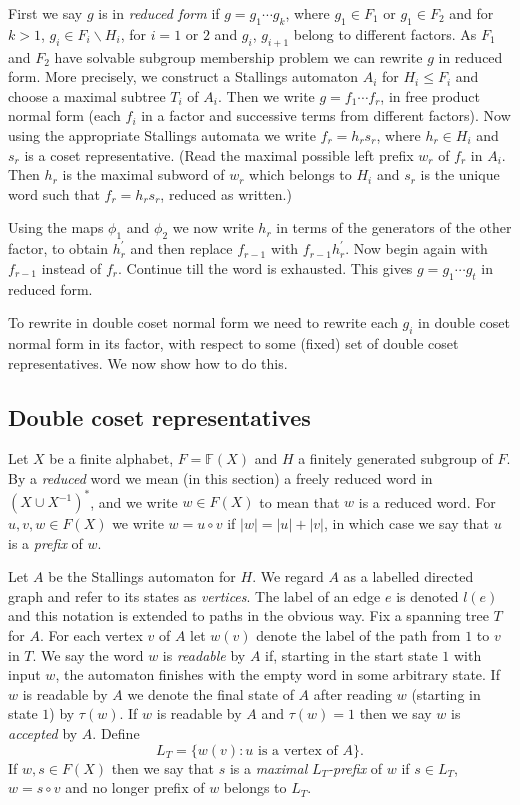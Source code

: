 \documentclass[a4paper,12pt]{article}
\def\t{\tau }
\numberwithin{equation}{section}
\numberwithin{figure}{section}
\newcommand{\FF}{\ensuremath{\mathbb{F}}}
\begin{document}
First we say $g$ is in \emph{reduced form} if $g = g_1 \cdots g_k$, where
$g_1 \in F_1$ or $g_1 \in F_2$ and 
for 
$k > 1$,    $g_i \in F_i \backslash H_i$, for $i=1$ or $2$ 
 and $g_i$, ${g_{i+1}}$ belong to different factors. As $F_1$ and 
$F_2$ have solvable subgroup membership problem we can rewrite $g$ in
reduced form. More precisely, we construct a Stallings automaton $A_i$ for
$H_i\le F_i$ and choose a maximal subtree $T_i$ of $A_i$. 
Then we write $g=f_1\cdots f_r$, in free product normal
form (each $f_i$ in a factor and successive terms from different factors).
Now using the appropriate Stallings automata we write $f_r=h_rs_r$, where
$h_r\in H_i$ and $s_r$ is a coset representative. (Read the maximal 
possible left prefix $w_r$ of $f_r$ in $A_i$. Then $h_r$ is the 
maximal subword of $w_r$ which belongs to $H_i$ and $s_r$ is the
unique word such that $f_r=h_rs_r$, reduced as written.)

Using the maps $\phi_1$ and $\phi_2$ we now write $h_r$ in terms of the
generators of the other factor, to obtain $h^\prime_r$ and then 
replace $f_{r-1}$ with $f_{r-1}h^\prime_r$. Now begin again with
$f_{r-1}$ instead of $f_r$. Continue till the word is exhausted.   
This gives $g=g_1\cdots g_t$ in reduced form.

To rewrite in double coset normal form we need to  
 rewrite
each $g_i$ in double coset normal form in its factor, 
with respect to some (fixed) set
of double coset representatives.  
We now show how to do this.
\subsection{Double coset representatives}
Let $X$ be a finite alphabet, $F=\FF(X)$ and $H$ a finitely generated subgroup
of $F$.  By a {\em reduced} word we mean (in
this section) a freely reduced word in $(X\cup X^{-1})^\ast$, and we write $w\in F(X)$
to mean that $w$ is a reduced word. For $u,v, w\in F(X)$ we 
write $w=u\circ v$ if $|w|=|u|+|v|$, in which case we say that $u$ is a {\em prefix}
of $w$. 

Let $A$ be the Stallings automaton for $H$. We regard $A$ as a 
labelled directed graph
and refer to its states as {\em vertices}. The label of an edge $e$ is denoted 
$l(e)$ and this notation is extended to paths in the obvious way. 
Fix a spanning tree $T$ for $A$. For 
each vertex $v$ of $A$ let $w(v)$ denote the label of the path from $1$ to $v$ in
$T$. We say the word $w$ is {\em readable} by $A$ if, starting in the 
start state $1$ with input $w$, the automaton finishes with the empty
word in some arbitrary state. If $w$ is readable by $A$ we denote the final
state of $A$ after reading $w$ (starting in state $1$) by $\t(w)$. 
If $w$ is readable by $A$ and $\t(w)=1$
 then we say $w$ is {\em accepted} by $A$. Define 
\[L_T=\{w(v): u \textrm{ is a vertex of } A\}.\]  
If $w, s\in F(X)$ then we say that $s$ is a {\em maximal} $L_T${\em -prefix} of $w$ if 
$s\in L_T$, $w=s\circ v$ and no longer prefix of $w$ belongs to $L_T$. 
\end{document}
